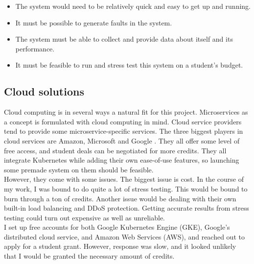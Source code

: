 \begin{itemize}
    \item The system would need to be relatively quick and easy to get up and running.
    \item It must be possible to generate faults in the system.
    \item The system must be able to collect and provide data about itself and its performance.
    \item It must be feasible to run and stress test this system on a student's budget.
\end{itemize}

\subsection{Cloud solutions}
Cloud computing is in several ways a natural fit for this project. Microservices as a concept is formulated with cloud computing in mind. Cloud service providers tend to provide some microservice-specific services.
The three biggest players in cloud services are Amazon, Microsoft and Google \cite*{DgtlInfra}. They all offer some level of free access, and student deals can be negotiated for more credits. They all integrate Kubernetes while adding their own ease-of-use features, so launching some premade system on them should be feasible. \\
However, they come with some issues. The biggest issue is cost. In the course of my work, I was bound to do quite a lot of stress testing. This would be bound to burn through a ton of credits. Another issue would be dealing with their own built-in load balancing and DDoS protection. Getting accurate results from stress testing could turn out expensive as well as unreliable.\\
I set up free accounts for both Google Kubernetes Engine (GKE), Google's distributed cloud service, and Amazon Web Services (AWS), and reached out to apply for a student grant. However, response was slow, and it looked unlikely that I would be granted the necessary amount of credits.

